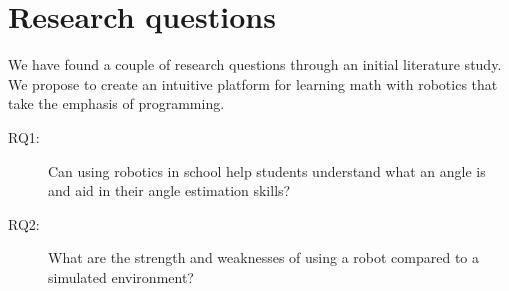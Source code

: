 \chapter{Research questions}
We have found a couple of research questions through an initial literature study. We propose to create an intuitive platform for learning math with robotics that take the emphasis of programming.

\begin{description}
	\item[RQ1: ] Can using robotics in school help students understand what an angle is and aid in their angle estimation skills?
	\item[RQ2: ] What are the strength and weaknesses of using a robot compared to a simulated environment?
\end{description}
